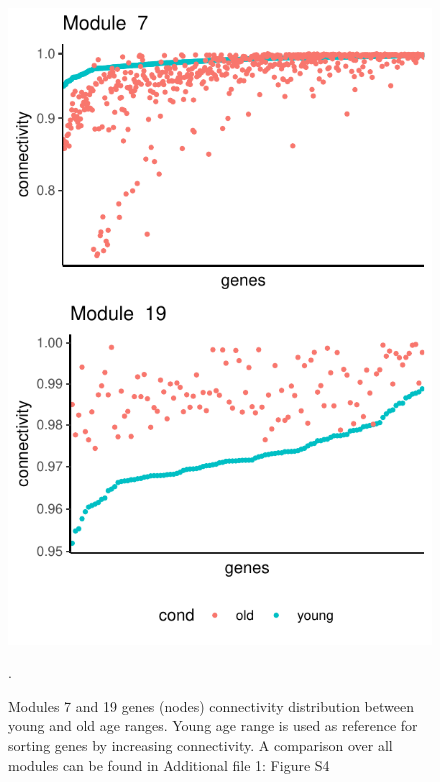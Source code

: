 \begin{figure}[!ht]
    \centering
    \includegraphics{img/chap1/figure_3.pdf}
    \caption[Modules 7 and 19 genes (nodes) connectivity distribution between young and old age ranges]{Modules 7 and 19 genes (nodes) connectivity distribution between young and old age ranges. Young age range is used as reference for sorting genes by increasing connectivity. A comparison over all modules can be found in Additional file 1: Figure S4}.
    \label{fig:fig_connectivity_drop}
\end{figure}


